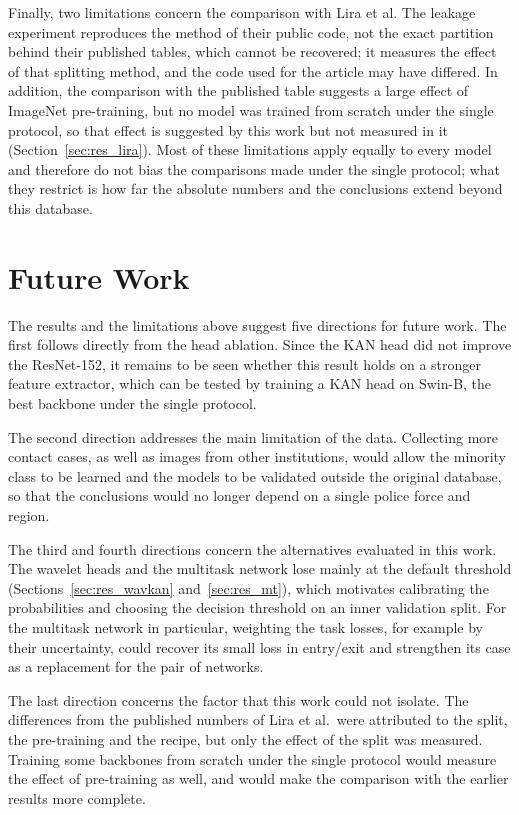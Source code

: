 Finally, two limitations concern the comparison with Lira et al. The leakage experiment reproduces the method of their public code, not the exact partition behind their published tables, which cannot be recovered; it measures the effect of that splitting method, and the code used for the article may have differed. In addition, the comparison with the published table suggests a large effect of ImageNet pre-training, but no model was trained from scratch under the single protocol, so that effect is suggested by this work but not measured in it (Section~\ref{sec:res_lira}). Most of these limitations apply equally to every model and therefore do not bias the comparisons made under the single protocol; what they restrict is how far the absolute numbers and the conclusions extend beyond this database.

\section{Future Work}
\label{sec:future}

The results and the limitations above suggest five directions for future work. The first follows directly from the head ablation. Since the KAN head did not improve the ResNet-152, it remains to be seen whether this result holds on a stronger feature extractor, which can be tested by training a KAN head on Swin-B, the best backbone under the single protocol.

The second direction addresses the main limitation of the data. Collecting more contact cases, as well as images from other institutions, would allow the minority class to be learned and the models to be validated outside the original database, so that the conclusions would no longer depend on a single police force and region.

The third and fourth directions concern the alternatives evaluated in this work. The wavelet heads and the multitask network lose mainly at the default threshold (Sections~\ref{sec:res_wavkan} and~\ref{sec:res_mt}), which motivates calibrating the probabilities and choosing the decision threshold on an inner validation split. For the multitask network in particular, weighting the task losses, for example by their uncertainty, could recover its small loss in entry/exit and strengthen its case as a replacement for the pair of networks.

The last direction concerns the factor that this work could not isolate. The differences from the published numbers of Lira et al.\ were attributed to the split, the pre-training and the recipe, but only the effect of the split was measured. Training some backbones from scratch under the single protocol would measure the effect of pre-training as well, and would make the comparison with the earlier results more complete.
